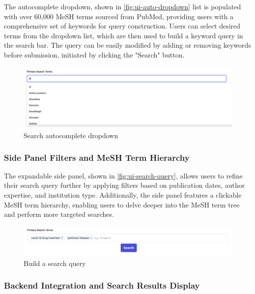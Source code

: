 The autocomplete dropdown, shown in \autoref{fig:ui-auto-dropdown} list is populated with over 60,000 MeSH terms sourced from PubMed, providing users with a comprehensive set of keywords for query construction. Users can select desired terms from the dropdown list, which are then used to build a keyword query in the search bar. The query can be easily modified by adding or removing keywords before submission, initiated by clicking the "Search" button.
\begin{figure}[hb!]
    \tiny
    \centering
    \includegraphics[width=\figwidth]{Images/ui-autocomplete.png}
    \caption{Search autocomplete dropdown}
    \label{fig:ui-auto-dropdown}
\end{figure}

\subsubsection{Side Panel Filters and MeSH Term Hierarchy}

The expandable side panel, shown in \autoref{fig:ui-search-query}, allows users to refine their search query further by applying filters based on publication dates, author expertise, and institution type. Additionally, the side panel features a clickable MeSH term hierarchy, enabling users to delve deeper into the MeSH term tree and perform more targeted searches.
\begin{figure}[hb!]
    \centering
    \includegraphics[width=\figwidth]{Images/ui-query.png}
    \caption{Build a search query}
    \label{fig:ui-search-query}
\end{figure}

\subsubsection{Backend Integration and Search Results Display}

